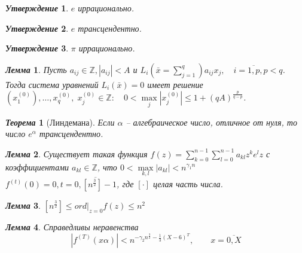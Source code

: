 \documentclass[a4paper,12pt]{article}
\newtheorem{teo2}{\textit{Теорема}}
\newtheorem{utv2}{\textit{Утверждение}}
\newtheorem{lem2}{\textit{Лемма}}
\newcommand{\AL}{\alpha}
\newcommand{\q}{\quad}
\newcommand{\bb}[1]{\mathbb{#1}}
\newcommand{\SL}{\sum\limits}
\begin{document}
\begin{formbox}{}
\begin{utv2} $e$ иррационально.
\end{utv2}
\end{formbox}
\begin{formbox}{}
\begin{utv2} $e$ трансцендентно.
\end{utv2}
\end{formbox}
\begin{formbox}{}
\begin{utv2} $\pi$ иррационально.
\end{utv2}
\end{formbox}
\begin{formbox}{}
\begin{lem2} Пусть \(a_{ij}\in\bb{Z}, |a_{ij}| < A\) и \(L_i(\bar{x} = \SL_{j=1}^q)a_{ij}x_j,\q i=\overline{1,p}, p < q\).\\
Тогда система уравнений \(L_i(\bar{x}) = 0\) имеет решение \((x_1^{(0)}),\dots,x_q^{(0)},\; x_j^{(0)} \in\bb{Z}:\q 0 < \max\limits_{j} |x_j^{(0)}|\le 1 + (qA)^{\frac{p}{q-p}} \).
\end{lem2}
\end{formbox}
\begin{formbox}{}
\begin{teo2} [Линдемана] Если $\AL$ -- алгебраическое число, отличное от нуля, то число $e^\AL$ трансцендентно.
\end{teo2}
\end{formbox}
\begin{formbox}{}
\begin{lem2} 
Существует такая функция $f(z) = \SL_{k=0}^{n-1}\SL_{l=0}^{n-1}a_{kl}z^ke^lz $ с коэффициентами $a_{kl} \in \bb{Z}$, что $0 < \max\limits_{k,l} |a_{kl}| < n^{\gamma_1n}$\\
$f^{(t)}(0) = 0, t = \overline{0, [n^{\frac{3}{2}}]-1}$, где $[\cdot]$ целая часть числа.
\end{lem2}
\end{formbox}
\begin{formbox}{}
\begin{lem2}
$[n^{\frac{3}{2}}]\le ord|_{z=0} f(z) \le n^2 $
\end{lem2}
\end{formbox}
\begin{formbox}{}
\begin{lem2} Справедливы неравенства
\[|f^{(T)}(x\AL)|  < n^{-\gamma_2 n^{\frac{3}{2}} - \frac{1}{3} (X-6)^T},\q\q x = \overline{0,X}\]
\end{lem2}
\end{formbox}
\end{document}
